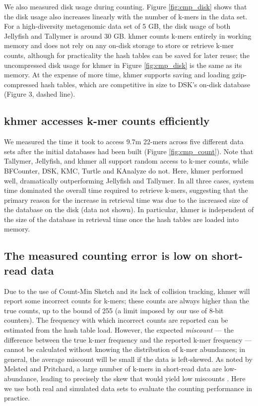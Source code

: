 \documentclass[10pt]{article}
\begin{document}
We also measured disk usage during counting.  Figure
\ref{fig:cmp_disk} shows that the disk usage also increases linearly
with the number of k-mers in the data set.  For a high-diversity
metagenomic data set of 5 GB, the disk usage of both Jellyfish and
Tallymer is around 30 GB.  khmer counts k-mers entirely in working
memory and does not rely on any on-disk storage to store or retrieve
k-mer counts, although for practicality the hash tables can be saved
for later reuse; the uncompressed disk usage for khmer in Figure
\ref{fig:cmp_disk} is the same as its memory.  At the expense of more
time, khmer supports saving and loading gzip-compressed hash tables,
which are competitive in size to DSK's on-disk database (Figure 3,
dashed line).

\subsection*{khmer accesses k-mer counts efficiently}

We measured the time it took to access 9.7m 22-mers across five
different data sets after the initial databases had been built (Figure
\ref{fig:cmp_count}).  Note that Tallymer, Jellyfish, and khmer all
support random access to k-mer counts, while BFCounter, DSK, KMC, Turtle and KAnalyze 
do not. Here, khmer
performed well, dramatically outperforming Jellyfish and Tallymer.  In
all three cases, system time dominated the overall time required to
retrieve k-mers, suggesting that the primary reason for the increase
in retrieval time was due to the increased size of the database on the
disk (data not shown).  In particular, khmer is independent of the
size of the database in retrieval time once the hash tables are loaded
into memory.

\subsection*{The measured counting error is low on short-read data}

Due to the use of Count-Min Sketch and its lack of collision tracking,
khmer will report some incorrect counts for k-mers; these counts are
always higher than the true counts, up to the bound of 255 (a limit
imposed by our use of 8-bit counters). The frequency with which
incorrect counts are reported can be estimated from the hash table
load.  However, the expected {\em miscount} --- the difference between
the true k-mer frequency and the reported k-mer frequency --- cannot
be calculated without knowing the distribution of k-mer abundances; in
general, the average miscount will be small if the data is
left-skewed.  As noted by Melsted and Pritchard, a large number of
k-mers in short-read data are low-abundance, leading to precisely the
skew that would yield low miscounts \cite{Melsted2011}.  Here we use
both real and simulated data sets to evaluate the counting performance
in practice.
\end{document}
